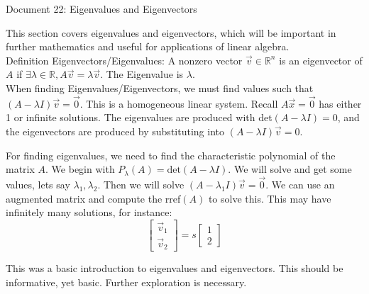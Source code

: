 \documentclass[11pt]{article}
\begin{document}
\begin{center}
Document 22: Eigenvalues and Eigenvectors
\end{center}

\vspace{0.2cm}
This section covers eigenvalues and eigenvectors, which will be important in further mathematics and useful for applications of linear algebra.\\

\noindent
Definition Eigenvectors/Eigenvalues: A nonzero vector $\vec{v}\in\mathbb{R}^n$ is an eigenvector of $A$ if $\exists\lambda\in\mathbb{R}, A\vec{v}=\lambda\vec{v}$. The Eigenvalue is $\lambda$.\\

When finding Eigenvalues/Eigenvectors, we must find values such that $(A-\lambda I)\vec{v}=\vec{0}$. This is a homogeneous linear system. Recall $A\vec{x}=\vec{0}$ has either 1 or infinite solutions. The eigenvalues are produced with det$(A-\lambda I)=0$, and the eigenvectors are produced by substituting into $(A-\lambda I)\vec{v}=0$.

For finding eigenvalues, we need to find the characteristic polynomial of the matrix $A$. We begin with $P_\lambda (A)=\text{det}(A-\lambda I)$. We will solve and get some values, lets say $\lambda_1,\lambda_2$. Then we will solve $(A-\lambda_1 I)\vec{v}=\vec{0}$. We can use an augmented matrix and compute the rref$(A)$ to solve this. This may have infinitely many solutions, for instance: $$\begin{bmatrix}\vec{v}_1\\\vec{v}_2\end{bmatrix}=s\begin{bmatrix}1\\2\end{bmatrix}$$

This was a basic introduction to eigenvalues and eigenvectors. This should be informative, yet basic. Further exploration is necessary.
\end{document}

